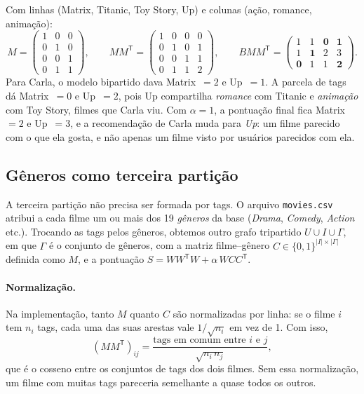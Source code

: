 \documentclass[12pt,a4paper]{article}
\theoremstyle{definition}
\begin{document}
Com linhas (Matrix, Titanic, Toy Story, Up) e colunas
(ação, romance, animação):
\[
  M = \begin{pmatrix}
    1 & 0 & 0\\
    0 & 1 & 0\\
    0 & 0 & 1\\
    0 & 1 & 1
  \end{pmatrix},
  \qquad
  MM^{\mathsf T} = \begin{pmatrix}
    1 & 0 & 0 & 0\\
    0 & 1 & 0 & 1\\
    0 & 0 & 1 & 1\\
    0 & 1 & 1 & 2
  \end{pmatrix},
  \qquad
  BMM^{\mathsf T} = \begin{pmatrix}
    1 & 1 & \mathbf{0} & \mathbf{1}\\
    1 & \mathbf{1} & 2 & 3\\
    \mathbf{0} & 1 & 1 & \mathbf{2}
  \end{pmatrix}.
\]
Para Carla, o modelo bipartido dava \mbox{Matrix $= 2$} e \mbox{Up $= 1$}. A parcela de
tags dá \mbox{Matrix $= 0$} e \mbox{Up $= 2$}, pois Up compartilha \emph{romance} com
Titanic e \emph{animação} com Toy Story, filmes que Carla viu. Com
$\alpha = 1$, a pontuação final fica \mbox{Matrix $= 2$} e \mbox{Up $= 3$}, e a
recomendação de Carla muda para \emph{Up}: um filme parecido com o que ela
gosta, e não apenas um filme visto por usuários parecidos com ela.

\subsection{Gêneros como terceira partição}\label{sec:generos}

A terceira partição não precisa ser formada por tags. O arquivo
\texttt{movies.csv} atribui a cada filme um ou mais dos 19 \emph{gêneros}
da base (\emph{Drama}, \emph{Comedy}, \emph{Action} etc.). Trocando as tags
pelos gêneros, obtemos outro grafo tripartido $U \cup I \cup \Gamma$, em
que $\Gamma$ é o conjunto de gêneros, com a matriz filme--gênero
$C \in \{0,1\}^{|I| \times |\Gamma|}$ definida como $M$, e
a pontuação $S = WW^{\mathsf T}W + \alpha\, WCC^{\mathsf T}$.

\paragraph{Normalização.}
Na implementação, tanto $M$ quanto $C$ são normalizadas por linha: se o
filme $i$ tem $n_i$ tags, cada uma das suas arestas vale $1/\sqrt{n_i}$
em vez de 1. Com isso,
\[
  (MM^{\mathsf T})_{ij} = \frac{\text{tags em comum entre } i \text{ e } j}{\sqrt{n_i\, n_j}},
\]
que é o cosseno entre os conjuntos de tags dos dois filmes. Sem essa
normalização, um filme com muitas tags pareceria semelhante a quase
todos os outros.
\end{document}
